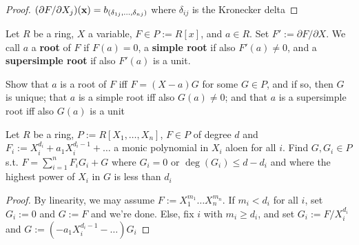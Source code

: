 \documentclass[11pt]{article}
\begin{document}
\begin{proof}
\((\partial F/\partial X_j)(\operatorname{\textbf{x}})=b_{(\delta_{1j},\dots,\delta_{nj})}\) where
\(\delta_{ij}\) is the Kronecker delta
\end{proof}

\begin{exercise}
\label{ex1.19}
Let \(R\) be a ring, \(X\) a variable, \(F\in P:=R[x]\), and \(a\in R\). Set
\(F':=\partial F/\partial X\). We call \(a\) a \textbf{root} of \(F\) if \(F(a)=0\), a
\textbf{simple root} if also \(F'(a)\neq0\), and a \textbf{supersimple root} if also \(F'(a)\)
is a unit.

Show that \(a\) is a root of \(F\) iff \(F=(X-a)G\) for some \(G\in P\), and
if so, then \(G\) is unique; that \(a\) is a simple root iff also
\(G(a)\neq0\); and that \(a\) is a supersimple root iff also \(G(a)\) is a unit
\end{exercise}

\begin{exercise}
\label{ex1.20}
Let \(R\) be a ring, \(P:=R[X_1,\dots,X_n]\), \(F\in P\) of degree \(d\) and
\(F_i:=X_i^{d_i}+a_1X_i^{d_i-1}+\dots\) a monic polynomial in \(X_i\) aloen
for all \(i\). Find \(G,G_i\in P\) s.t. \(F=\sum_{i=1}^nF_iG_i+G\) where
\(G_i=0\) or \(\deg(G_i)\le d-d_i\) and where the highest power of \(X_i\) in
\(G\) is less than \(d_i\)
\end{exercise}

\begin{proof}
By linearity, we may assume \(F:=X_1^{m_1}\dots X_n^{m_n}\). If \(m_i<d_i\)
for all \(i\), set \(G_i:=0\) and \(G:=F\) and we're done. Else, fix \(i\)
with \(m_i\ge d_i\), and set \(G_i:=F/X_i^{d_i}\) and \(G:=(-a_1X_i^{d_i-1}-\dots)G_i\)
\end{proof}
\end{document}
